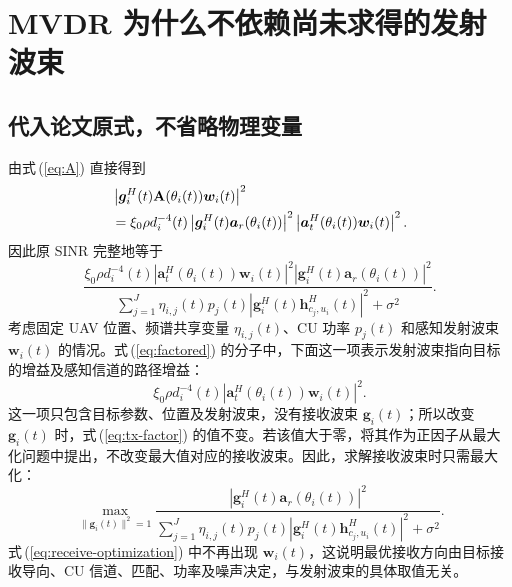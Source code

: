 \documentclass[11pt,a4paper]{ctexart}
\begin{document}
\section{MVDR 为什么不依赖尚未求得的发射波束}
\subsection{代入论文原式，不省略物理变量}
由式\,(\ref{eq:A}) 直接得到
\begin{align}
&\left|\bm g_i^H(t)\mathbf A(\theta_i(t))\bm w_i(t)\right|^2\notag\\
&=\xi_0\rho d_i^{-4}(t)
\left|\bm g_i^H(t)\bm a_r(\theta_i(t))\right|^2
\left|\bm a_t^H(\theta_i(t))\bm w_i(t)\right|^2.\label{eq:factor}
\end{align}
因此原 SINR 完整地等于
\begin{equation}\label{eq:factored}
\frac{\xi_0\rho d_i^{-4}(t)
\left|\bm a_t^H(\theta_i(t))\bm w_i(t)\right|^2
\left|\bm g_i^H(t)\bm a_r(\theta_i(t))\right|^2}
{\displaystyle\sum_{j=1}^J\eta_{i,j}(t)p_j(t)
\left|\bm g_i^H(t)\bm h_{c_j,u_i}^{H}(t)\right|^2+\sigma^2}.
\end{equation}
考虑固定 UAV 位置、频谱共享变量 $\eta_{i,j}(t)$、CU 功率 $p_j(t)$ 和感知发射波束 $\bm w_i(t)$ 的情况。式\,(\ref{eq:factored}) 的分子中，下面这一项表示发射波束指向目标的增益及感知信道的路径增益：
\begin{equation}\label{eq:tx-factor}
\xi_0\rho d_i^{-4}(t)
\left|\bm a_t^H(\theta_i(t))\bm w_i(t)\right|^2.
\end{equation}
这一项只包含目标参数、位置及发射波束，没有接收波束 $\bm g_i(t)$；所以改变 $\bm g_i(t)$ 时，式\,(\ref{eq:tx-factor}) 的值不变。若该值大于零，将其作为正因子从最大化问题中提出，不改变最大值对应的接收波束。因此，求解接收波束时只需最大化：
\begin{equation}\label{eq:receive-optimization}
\max_{\|\bm g_i(t)\|^2=1}
\frac{\left|\bm g_i^H(t)\bm a_r(\theta_i(t))\right|^2}
{\displaystyle\sum_{j=1}^J\eta_{i,j}(t)p_j(t)
\left|\bm g_i^H(t)\bm h_{c_j,u_i}^{H}(t)\right|^2+\sigma^2}.
\end{equation}
式\,(\ref{eq:receive-optimization}) 中不再出现 $\bm w_i(t)$，这说明最优接收方向由目标接收导向、CU 信道、匹配、功率及噪声决定，与发射波束的具体取值无关。
\end{document}
